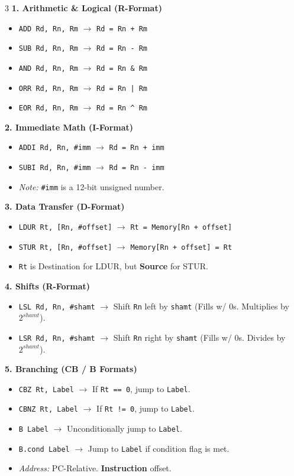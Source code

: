 \documentclass[6pt, letterpaper]{article}
\begin{document}
\begin{multicols}{3}
\textbf{1. Arithmetic \& Logical (R-Format)}
\begin{itemize}
    \item \texttt{ADD Rd, Rn, Rm} $\rightarrow$ \texttt{Rd = Rn + Rm}
    \item \texttt{SUB Rd, Rn, Rm} $\rightarrow$ \texttt{Rd = Rn - Rm}
    \item \texttt{AND Rd, Rn, Rm} $\rightarrow$ \texttt{Rd = Rn \& Rm}
    \item \texttt{ORR Rd, Rn, Rm} $\rightarrow$ \texttt{Rd = Rn | Rm}
    \item \texttt{EOR Rd, Rn, Rm} $\rightarrow$ \texttt{Rd = Rn \textasciicircum{} Rm}
\end{itemize}

\textbf{2. Immediate Math (I-Format)}
\begin{itemize}
    \item \texttt{ADDI Rd, Rn, \#imm} $\rightarrow$ \texttt{Rd = Rn + imm}
    \item \texttt{SUBI Rd, Rn, \#imm} $\rightarrow$ \texttt{Rd = Rn - imm}
    \item \textit{Note:} \texttt{\#imm} is a 12-bit unsigned number.
\end{itemize}

\textbf{3. Data Transfer (D-Format)}
\begin{itemize}
    \item \texttt{LDUR Rt, [Rn, \#offset]} $\rightarrow$ \texttt{Rt = Memory[Rn + offset]}
    \item \texttt{STUR Rt, [Rn, \#offset]} $\rightarrow$ \texttt{Memory[Rn + offset] = Rt}
    \item \texttt{Rt} is Destination for LDUR, but \textbf{Source} for STUR.
\end{itemize}

\textbf{4. Shifts (R-Format)}
\begin{itemize}
    \item \texttt{LSL Rd, Rn, \#shamt} $\rightarrow$ Shift \texttt{Rn} left by \texttt{shamt} (Fills w/ 0s. Multiplies by $2^{shamt}$).
    \item \texttt{LSR Rd, Rn, \#shamt} $\rightarrow$ Shift \texttt{Rn} right by \texttt{shamt} (Fills w/ 0s. Divides by $2^{shamt}$).
\end{itemize}

\textbf{5. Branching (CB / B Formats)}
\begin{itemize}
    \item \texttt{CBZ Rt, Label} $\rightarrow$ If \texttt{Rt == 0}, jump to \texttt{Label}.
    \item \texttt{CBNZ Rt, Label} $\rightarrow$ If \texttt{Rt != 0}, jump to \texttt{Label}.
    \item \texttt{B Label} $\rightarrow$ Unconditionally jump to \texttt{Label}.
    \item \texttt{B.cond Label} $\rightarrow$ Jump to \texttt{Label} if condition flag is met.
    \item \textit{Address:} PC-Relative. \textbf{Instruction} offset.
\end{itemize}


\end{multicols}
\end{document}

